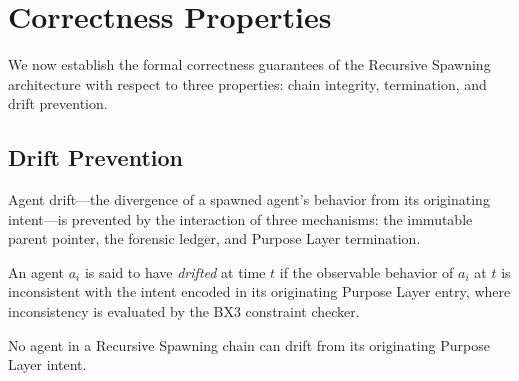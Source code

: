 \section{Correctness Properties}

We now establish the formal correctness guarantees of the Recursive Spawning architecture with respect to three properties: chain integrity, termination, and drift prevention.

\subsection{Drift Prevention}

Agent drift—the divergence of a spawned agent's behavior from its originating intent—is prevented by the interaction of three mechanisms: the immutable parent pointer, the forensic ledger, and Purpose Layer termination.

\begin{definition}[Drift]
An agent $a_i$ is said to have \emph{drifted} at time $t$ if the observable behavior of $a_i$ at $t$ is inconsistent with the intent encoded in its originating Purpose Layer entry, where inconsistency is evaluated by the BX3 constraint checker.
\end{definition}

\begin{theorem}
No agent in a Recursive Spawning chain can drift from its originating Purpose Layer intent.
\end{theorem}

